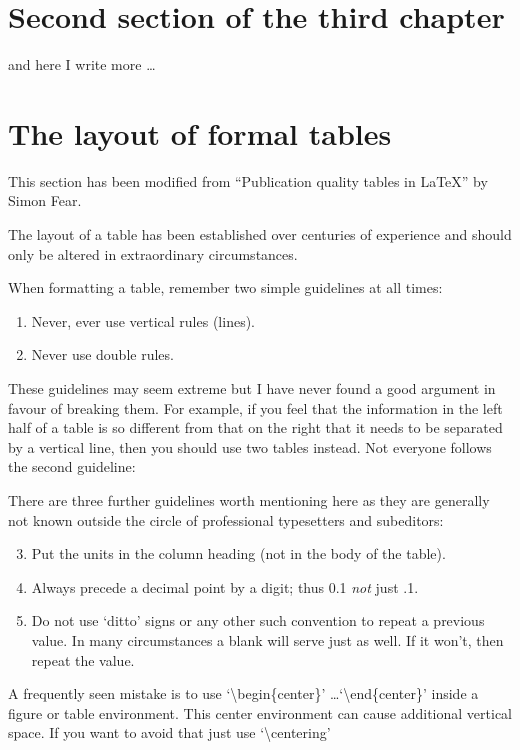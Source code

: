 \section{Second section of the third chapter}
and here I write more \dots

\section{The layout of formal tables}
This section has been modified from ``Publication quality tables in \LaTeX*''
by Simon Fear.

The layout of a table has been established over centuries of experience and 
should only be altered in extraordinary circumstances. 

When formatting a table, remember two simple guidelines at all times:

\begin{enumerate}
	\item Never, ever use vertical rules (lines).
	\item Never use double rules.
\end{enumerate}

These guidelines may seem extreme but I have
never found a good argument in favour of breaking them. For
example, if you feel that the information in the left half of
a table is so different from that on the right that it needs
to be separated by a vertical line, then you should use two
tables instead. Not everyone follows the second guideline:

There are three further guidelines worth mentioning here as they
are generally not known outside the circle of professional
typesetters and subeditors:

\begin{enumerate}\setcounter{enumi}{2}
	\item Put the units in the column heading (not in the body of
	the table).
	\item Always precede a decimal point by a digit; thus 0.1
	{\em not} just .1.
	\item Do not use `ditto' signs or any other such convention to
	repeat a previous value. In many circumstances a blank
	will serve just as well. If it won't, then repeat the value.
\end{enumerate}

A frequently seen mistake is to use `\textbackslash begin\{center\}' \dots `\textbackslash end\{center\}' inside a figure or table environment. This center environment can cause additional vertical space. If you want to avoid that just use `\textbackslash centering'


